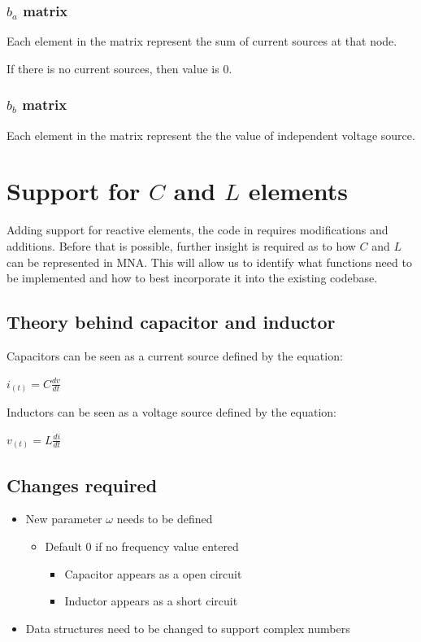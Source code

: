 \documentclass[a4paper, titlepage]{article}
\begin{document}
    \subsubsection{$b_a$ matrix}
    Each element in the matrix represent the sum of current sources at that node. \par
    If there is no current sources, then value is 0.
    \subsubsection{$b_b$ matrix}
    Each element in the matrix represent the the value of independent voltage source. \par

    \pagebreak

    \section{Support for $C$ and $L$ elements}
    Adding support for reactive elements, the code in requires modifications and additions. Before that is possible, 
    further insight is required as to how $C$ and $L$ can be represented in MNA. This will allow us to identify what functions 
    need to be implemented and how to best incorporate it into the existing codebase.\par
    \subsection{Theory behind capacitor and inductor}
    Capacitors can be seen as a current source defined by the equation:
    \begin{center}
        $i_{(t)} = C\frac{dv}{dt}$ \par
    \end{center}
    Inductors can be seen as a voltage source defined by the equation:
    \begin{center}
        $v_{(t)} = L\frac{di}{dt}$ \par
    \end{center}
    \subsection{Changes required}
    \begin{itemize}
        \item New parameter $\omega$ needs to be defined
        \begin{itemize}
            \item Default 0 if no frequency value entered
            \begin{itemize}
                \item Capacitor appears as a open circuit
                \item Inductor appears as a short circuit
            \end{itemize}
        \end{itemize}
        \item Data structures need to be changed to support complex numbers
    \end{itemize}
\end{document}
